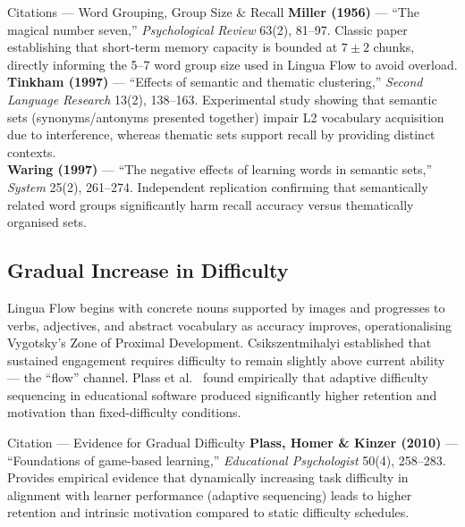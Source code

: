 \documentclass[10pt,a4paper]{article}
\begin{document}
\begin{citationbox}{Citations --- Word Grouping, Group Size \& Recall}
\textbf{Miller (1956)} --- ``The magical number seven,'' \emph{Psychological Review} 63(2), 81--97. Classic paper establishing that short-term memory capacity is bounded at $7 \pm 2$ chunks, directly informing the 5--7 word group size used in Lingua Flow to avoid overload.\\[3pt]
\textbf{Tinkham (1997)} --- ``Effects of semantic and thematic clustering,'' \emph{Second Language Research} 13(2), 138--163. Experimental study showing that semantic sets (synonyms/antonyms presented together) impair L2 vocabulary acquisition due to interference, whereas thematic sets support recall by providing distinct contexts.\\[3pt]
\textbf{Waring (1997)} --- ``The negative effects of learning words in semantic sets,'' \emph{System} 25(2), 261--274. Independent replication confirming that semantically related word groups significantly harm recall accuracy versus thematically organised sets.
\end{citationbox}

\subsection{Gradual Increase in Difficulty}
Lingua Flow begins with concrete nouns supported by images and progresses to verbs, adjectives, and abstract vocabulary as accuracy improves, operationalising Vygotsky's Zone of Proximal Development. Csikszentmihalyi \cite{csikszentmihalyi1990flow} established that sustained engagement requires difficulty to remain slightly above current ability --- the ``flow'' channel. Plass et al.\ \cite{plass2010cognitive} found empirically that adaptive difficulty sequencing in educational software produced significantly higher retention and motivation than fixed-difficulty conditions.

\begin{citationbox}{Citation --- Evidence for Gradual Difficulty}
\textbf{Plass, Homer \& Kinzer (2010)} --- ``Foundations of game-based learning,'' \emph{Educational Psychologist} 50(4), 258--283. Provides empirical evidence that dynamically increasing task difficulty in alignment with learner performance (adaptive sequencing) leads to higher retention and intrinsic motivation compared to static difficulty schedules.
\end{citationbox}

\end{document}
